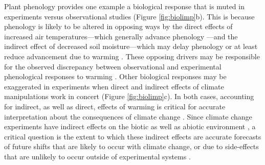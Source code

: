 \documentclass{article}
\begin{document}
\par Plant phenology provides one example a biological response that is muted in experiments versus observational studies (Figure \ref{fig:biolimp}b). This is because phenology is likely to be altered in opposing ways by the direct effects of increased air temperatures---which generally advance phenology \citep{wolkovich2012}---and the indirect effect of decreased soil moisture---which may delay phenology or at least reduce advancement due to warming \citep{penuelas2004,ourcival2011,craine2012,matthews2016}. %
These opposing drivers may be responsible for the observed discrepancy between observational and experimental phenological responses to warming \citep{wolkovich2012}. Other biological responses may be exaggerated in experiments when direct and indirect effects of climate manipulations work in concert (Figure \ref{fig:biolimp}c). In both cases, accounting for indirect, as well as direct, effects of warming is critical for accurate interpretation about the consequences of climate change \citep{kharouba2015}. Since climate change experiments have indirect effects on the biotic as well as abiotic environment \citep{hoeppner2012,pelini2014,diamond2016}, a critical question is the extent to which these indirect effects are accurate forecasts of future shifts that are likely to occur with climate change, or due to side-effects that are unlikely to occur outside of experimental systems \citep{moise2010,diamond2013}.%
\end{document}
